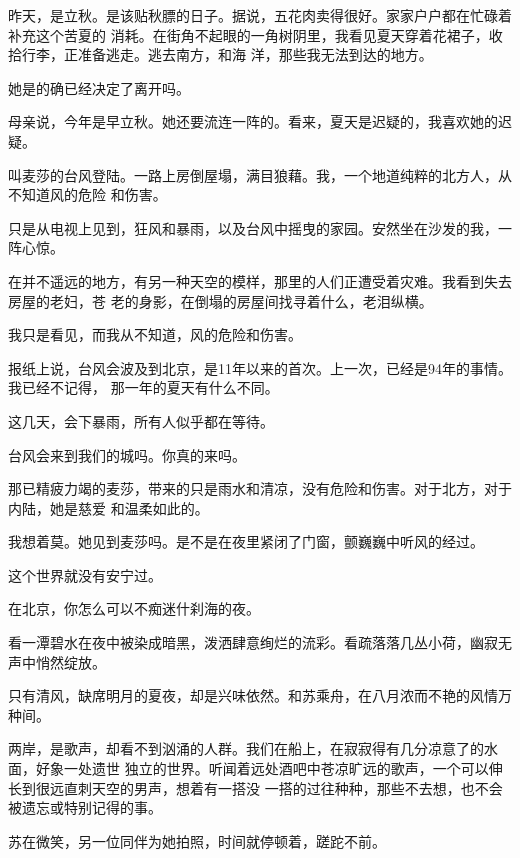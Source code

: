 \documentclass[12pt,a4paper]{article}
\begin{document}
	\endwriting



		昨天，是立秋。是该贴秋膘的日子。据说，五花肉卖得很好。家家户户都在忙碌着补充这个苦夏的
	消耗。在街角不起眼的一角树阴里，我看见夏天穿着花裙子，收拾行李，正准备逃走。逃去南方，和海
	洋，那些我无法到达的地方。

		她是的确已经决定了离开吗。

		母亲说，今年是早立秋。她还要流连一阵的。看来，夏天是迟疑的，我喜欢她的迟疑。


		叫麦莎的台风登陆。一路上房倒屋塌，满目狼藉。我，一个地道纯粹的北方人，从不知道风的危险
	和伤害。

		只是从电视上见到，狂风和暴雨，以及台风中摇曳的家园。安然坐在沙发的我，一阵心惊。

		在并不遥远的地方，有另一种天空的模样，那里的人们正遭受着灾难。我看到失去房屋的老妇，苍
	老的身影，在倒塌的房屋间找寻着什么，老泪纵横。

		我只是看见，而我从不知道，风的危险和伤害。

		报纸上说，台风会波及到北京，是11年以来的首次。上一次，已经是94年的事情。我已经不记得，
	那一年的夏天有什么不同。

		这几天，会下暴雨，所有人似乎都在等待。

		台风会来到我们的城吗。你真的来吗。

		那已精疲力竭的麦莎，带来的只是雨水和清凉，没有危险和伤害。对于北方，对于内陆，她是慈爱
	和温柔如此的。

		我想着莫。她见到麦莎吗。是不是在夜里紧闭了门窗，颤巍巍中听风的经过。


		这个世界就没有安宁过。

	\endwriting



		在北京，你怎么可以不痴迷什刹海的夜。

		看一潭碧水在夜中被染成暗黑，泼洒肆意绚烂的流彩。看疏落落几丛小荷，幽寂无声中悄然绽放。

		只有清风，缺席明月的夏夜，却是兴味依然。和苏乘舟，在八月浓而不艳的风情万种间。

		两岸，是歌声，却看不到汹涌的人群。我们在船上，在寂寂得有几分凉意了的水面，好象一处遗世
	独立的世界。听闻着远处酒吧中苍凉旷远的歌声，一个可以伸长到很远直刺天空的男声，想着有一搭没
	一搭的过往种种，那些不去想，也不会被遗忘或特别记得的事。

		苏在微笑，另一位同伴为她拍照，时间就停顿着，蹉跎不前。
\end{document}
